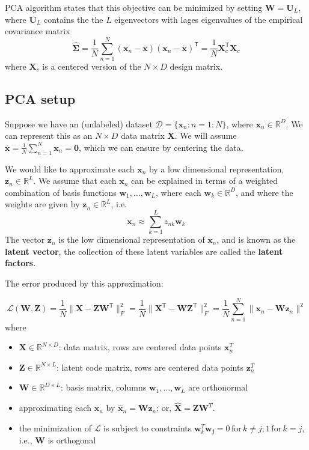 \documentclass[11pt]{article}
\begin{document}
PCA algorithm states that this objective can be minimized by setting $\mathbf{W} = \mathbf{U}_L$, where $\mathbf{U}_L$ contains the the $L$ eigenvectors with lages eigenvalues of the empirical covariance matrix 
\[
\hat{\boldsymbol{\Sigma}} = \frac{1}{N} \sum_{n=1}^N (\boldsymbol{x}_n - \overline{\boldsymbol{x}})(\boldsymbol{x}_n - \overline{\boldsymbol{x}})^\mathsf{T} = \frac{1}{N} \mathbf{X}_c^\mathsf{T}\mathbf{X}_c
\]
where $\mathbf{X}_c$ is a centered version of the $N \times D$ design matrix.

\subsection{PCA setup}
Suppose we have an (unlabeled) dataset $\mathcal{D} = \{\boldsymbol{x}_n : n = 1:N\}$, where $\boldsymbol{x}_n \in \mathbb{R}^D$. We can represent this as an $N \times D$ data matrix $\mathbf{X}$. We will assume $\overline{\boldsymbol{x}} = \frac{1}{N}\sum_{n=1}^N \boldsymbol{x}_n = \mathbf{0}$, which we can ensure by centering the data.

We would like to approximate each $\boldsymbol{x}_n$ by a low dimensional representation, $\boldsymbol{z}_n \in \mathbb{R}^L$. We assume that each $\boldsymbol{x}_n$ can be explained in terms of a weighted combination of basis functions $\boldsymbol{w}_1, \dots, \boldsymbol{w}_L$, where each $\boldsymbol{w}_k \in \mathbb{R}^D$, and where the weights are given by $\boldsymbol{z}_n \in \mathbb{R}^L$, i.e.
\[
\boldsymbol{x}_n \approx \sum_{k=1}^L z_{nk} \boldsymbol{w}_k
\]
The vector $\boldsymbol{z}_n$ is the low dimensional representation of $\boldsymbol{x}_n$, and is known as the \textbf{latent vector}, the collection of these latent variables are called the \textbf{latent factors}.

The error produced by this approximation:

\[
\mathcal{L}(\mathbf{W}, \mathbf{Z}) = \frac{1}{N} \|\mathbf{X} - \mathbf{Z}\mathbf{W}^\mathsf{T}\|_F^2 = \frac{1}{N} \|\mathbf{X}^\mathsf{T} - \mathbf{W}\mathbf{Z}^\mathsf{T}\|_F^2 = \frac{1}{N} \sum_{n=1}^N \|\boldsymbol{x}_n - \mathbf{W}\boldsymbol{z}_n\|^2
\]
where
\begin{itemize}
    \item $\mathbf{X} \in \mathbb{R}^{N \times D}$: data matrix, rows are centered data points $\mathbf{x}_n^T$
    \item $\mathbf{Z} \in \mathbb{R}^{N \times L}$: latent code matrix, rows are centered data points $\mathbf{z}_n^T$
    \item $\mathbf{W} \in \mathbb{R}^{D \times L}$: basis matrix, columns $\boldsymbol{w}_1, \dots, \boldsymbol{w}_L$ are orthonormal
    \item approximating each $\boldsymbol{x}_n$ by $\hat{\boldsymbol{x}}_n = \mathbf{W}\boldsymbol{z}_n$; or, $\hat{\mathbf{X}
    } = \mathbf{Z} \mathbf{W}^T$.
    \item the minimization of $\mathcal{L}$ is subject to constraints $\mathbf{w}_k^T \mathbf{w_j} = 0 \, \text{for}\, k \neq j \text{;}\, 1 \, \text{for}\, k = j$, i.e., $\mathbf{W}$ is orthogonal
\end{itemize}
\end{document}
